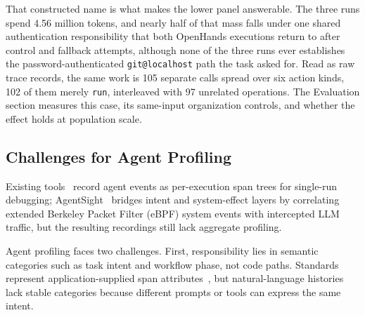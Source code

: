 \documentclass[letterpaper]{article}
\begin{document}
That constructed name is what makes the lower panel answerable. The three runs
spend 4.56 million tokens, and nearly half of that mass falls under one shared
authentication responsibility that both OpenHands executions return to after
control and fallback attempts, although none of the three runs ever
establishes the password-authenticated \texttt{git@localhost} path the task
asked for. Read as raw trace records, the same work is 105 separate calls
spread over six action kinds, 102 of them merely \texttt{run}, interleaved
with 97 unrelated operations. The Evaluation section measures this case, its
same-input organization controls, and whether the effect holds at population
scale.

\subsection{Challenges for Agent Profiling}

Existing tools~\cite{langsmith,langfuse,otel} record agent events as
per-execution span trees for single-run debugging; AgentSight~\cite{agentsight}
bridges intent and system-effect layers by correlating extended Berkeley Packet
Filter (eBPF) system events with intercepted LLM traffic, but the resulting
recordings still lack aggregate profiling.


Agent profiling faces two challenges. First, responsibility lies in semantic
categories such as task intent and workflow phase, not code paths.
Standards represent application-supplied span attributes~\cite{otel,
openinference}, but natural-language histories lack stable categories because
different prompts or tools can express the same intent.
\end{document}
